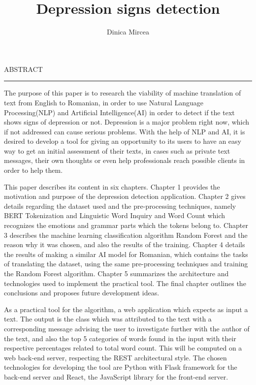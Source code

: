 \documentclass[12pt]{report}
\begin{document}
\title{Depression signs detection}					   
\author{Dinica Mircea}											
				
\maketitle


\newpage
\thispagestyle{empty}
\mbox{}
\newpage
{} 

\cleardoublepage
ABSTRACT
\vspace{0.5cm}	
\hrule
\vspace{0.5cm}	

The purpose of this paper is to research the viability of machine translation of text from English to Romanian, in order to use Natural Language Processing(NLP) and Artificial Intelligence(AI) in order to detect if the text shows signs of depression or not. Depression is a major problem right now, which if not addressed can cause serious problems. With the help of NLP and AI, it is desired to develop a tool for giving an opportunity to its users to have an easy way to get an initial assessment of their texts, in cases such as private text messages, their own thoughts or even help professionals reach possible clients in order to help them.

This paper describes its content in six chapters. Chapter 1 provides the motivation and purpose of the depression detection application. Chapter 2 gives details regarding the dataset used and the pre-processing techniques, namely BERT Tokenization and Linguistic Word Inquiry and Word Count which recognizes the emotions and grammar parts which the tokens belong to. Chapter 3 describes the machine learning classification algorithm Random Forest and the reason why it was chosen, and also the results of the training. Chapter 4 details the results of making a similar AI model for Romanian, which contains the tasks of translating the dataset, using the same pre-processing techniques and training the Random Forest algorithm.
Chapter 5 summarizes the architecture and technologies used to implement the practical tool. The final chapter outlines the conclusions and proposes future development ideas. 

As a practical tool for the algorithm, a web application which expects as input a text. The output is the class which was attributed to the text with a corresponding message advising the user to investigate further with the author of the text, and also the top 5 categories of words found in the input with their respective percentages related to total word count. This will be computed on a web back-end server, respecting the REST architectural style. The chosen technologies for developing the tool are Python with Flask framework for the back-end server and React, the JavaScript library for the front-end server.
\end{document}
